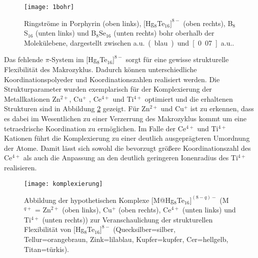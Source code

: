  

\begin{figure}[ht!]
	\centering
	\texttt{[image: 1bohr]}
	\captionsetup{figurewithin = chapter}
	\captionsetup{font=small, labelfont=bf}\caption[{Ringströme in Porphyrin, $[$Hg$_8$Te$_{16}]^{8-}$, B$_8$S$_{16}$ und B$_8$Se$_{16}$}]{Ringströme in Porphyrin (oben links), $[$Hg$_8$Te$_{16}]^{8-}$ (oben rechts), B$_8$S$_{16}$ (unten links) und B$_8$Se$_{16}$ (unten rechts) \unit[1]{bohr} oberhalb der Molekülebene, dargestellt zwischen \unit[0]{a.u.} (blau) und \unit[0.07]{a.u.}.}
\label{abb:lic}
\end{figure}

\FloatBarrier
Das fehlende $\pi$-System im $[$Hg$_8$Te$_{16}]^{8-}$ sorgt für eine gewisse strukturelle Flexibilität des Makrozyklus. Dadurch können unterschiedliche Koordinationspolyeder und Koordinationszahlen realisiert werden. Die Strukturparameter wurden exemplarisch für der Komplexierung der Metallkationen Zn$^{2+}$, Cu$^+$ , Ce$^{4+}$ und Ti$^{4+}$ optimiert und die erhaltenen Strukturen sind in Abbildung \ref{abb:komplexierung} gezeigt. Für Zn$^{2+}$ und Cu$^+$ ist zu erkennen, dass es dabei im Wesentlichen zu einer Verzerrung des Makrozyklus kommt um eine tetraedrische Koordination zu ermöglichen. Im Falle der Ce$^{4+}$ und Ti$^{4+}$ Kationen führt die Komplexierung zu einer deutlich ausgeprägteren Umordnung der Atome. Damit lässt sich sowohl die bevorzugt größere Koordinationszahl des Ce$^{4+}$ als auch die Anpassung an den deutlich geringeren Ionenradius des Ti$^{4+}$ realisieren.

\begin{figure}[ht!]
	\centering
	\texttt{[image: komplexierung]}
	\captionsetup{figurewithin = chapter}
	\captionsetup{font=small, labelfont=bf}\caption[{Abbildungen der hypothetischen Komplexe [M@Hg$_8$Te$_{16}]^{(8-q)-}$ (M$^{q+}$ = Zn$^{2+}$, Cu$^+$ , Ce$^{4+}$ und Ti$^{4+}$)}]{{Abbildung der hypothetischen Komplexe [M@Hg$_8$Te$_{16}]^{(8-q)-}$ (M$^{q+}$ = Zn$^{2+}$ (oben links), Cu$^+$ (oben rechts), Ce$^{4+}$ (unten links) und Ti$^{4+}$ (unten rechts))} zur Veranschaulichung der strukturellen Flexibilität von $[$Hg$_8$Te$_{16}]^{8-}$ (Quecksilber=silber, Tellur=orangebraun, Zink=lilablau, Kupfer=kupfer, Cer=hellgelb, Titan=türkis). }
\label{abb:komplexierung}
\end{figure}

